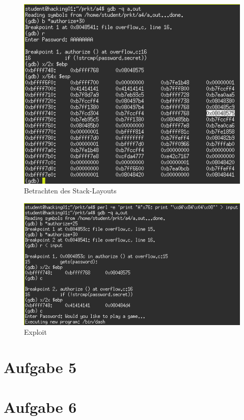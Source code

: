 \documentclass[11pt,a4paper]{article}
\begin{document}
\begin{figure}[h!]
  \caption{Betrachten des Stack-Layouts}
  \label{a4_2}
  \centering
    \includegraphics[scale=0.5]{a4_2.png}
\end{figure}
\begin{figure}[h!]
  \caption{Exploit}
  \label{a4_3}
  \centering
    \includegraphics[scale=0.5]{a4_3.png}
\end{figure}
\section{Aufgabe 5}
\section{Aufgabe 6}
\end{document}
